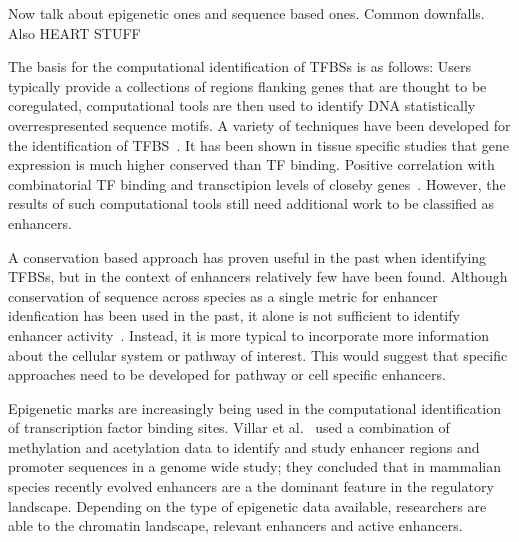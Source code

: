 

        Now talk about epigenetic
        ones and sequence based ones. Common downfalls. Also HEART STUFF
        
        The basis for the computational identification of TFBSs is as follows: Users typically provide a collections of regions flanking genes that are thought to be coregulated, computational tools are then used to identify DNA statistically overrespresented sequence motifs. A variety of techniques have been developed for the identification of TFBS~\cite{tompa2005assessing}. It has been shown in tissue specific studies that gene expression is much higher conserved than TF binding. Positive correlation with combinatorial TF binding and transctipion levels of closeby genes~\cite{wong2014decoupling}. However, the results of such computational tools still need additional work to be classified as enhancers. 
        
        A conservation based approach has proven useful in the past when identifying TFBSs, but in the context of enhancers relatively few have been found. Although conservation of sequence across species as a single metric for enhancer idenfication has been used in the past, it alone is not sufficient to identify enhancer activity~\cite{blow2010chip}. Instead, it is more typical to incorporate more information about the cellular system or pathway of interest. 
        This would suggest that specific approaches need to be developed for pathway or cell specific enhancers. 

        Epigenetic marks are increasingly being used in the computational identification of transcription factor binding sites. Villar et al.~\cite{villar2015enhancer} used a combination of methylation and acetylation data to identify and study enhancer regions and promoter sequences in a genome wide study; they concluded that in mammalian species recently evolved enhancers are a the dominant feature in the regulatory landscape. Depending on the type of epigenetic data available, researchers are able to the chromatin landscape, relevant enhancers and active enhancers.
        
